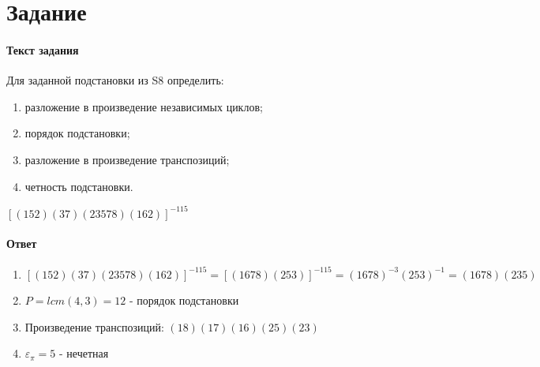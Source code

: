 \documentclass[a4paper, 12pt]{article}
\newcommand{\RNum}[1]{\uppercase\expandafter{\romannumeral #1\relax}}
\begin{document}
\section*{Задание \RNum{2}}
\paragraph{Текст задания}
Для заданной подстановки из S8 определить:
\begin{enumerate}[label=\asbuk*)]
    \item разложение в произведение независимых циклов;
    \item порядок подстановки;
    \item разложение в произведение транспозиций;
    \item четность подстановки.
\end{enumerate}
$ [(152)(37)(23578)(162)]^{-115} $
\paragraph{Ответ}
\begin{enumerate}[label=\asbuk*)]
    \item $ [(152)(37)(23578)(162)]^{-115} = [(1678)(253)]^{-115} = (1678)^{-3}(253)^{-1} = (1678)(235)$
    \item $ P = lcm(4,3) = 12 $ - порядок подстановки
    \item Произведение транспозиций: $ (18)(17)(16)(25)(23) $
    \item $ \varepsilon_{\pi} = 5$  - нечетная
\end{enumerate}
\end{document}
